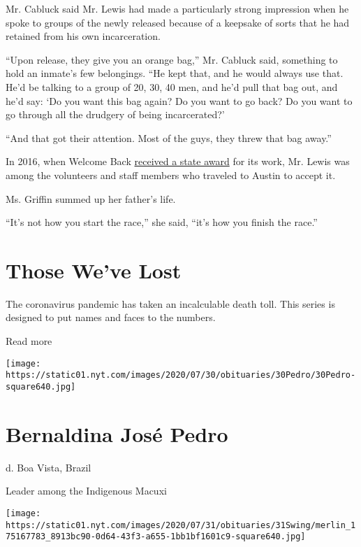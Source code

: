 Mr. Cabluck said Mr. Lewis had made a particularly strong impression
when he spoke to groups of the newly released because of a keepsake of
sorts that he had retained from his own incarceration.

``Upon release, they give you an orange bag,'' Mr. Cabluck said,
something to hold an inmate's few belongings. ``He kept that, and he
would always use that. He'd be talking to a group of 20, 30, 40 men, and
he'd pull that bag out, and he'd say: `Do you want this bag again? Do
you want to go back? Do you want to go through all the drudgery of being
incarcerated?'

``And that got their attention. Most of the guys, they threw that bag
away.''

In 2016, when Welcome Back
\href{https://www.tdcj.texas.gov/news/2016_vol_gov_awards/welcome_back_tarrant_county.html}{received
a state award} for its work, Mr. Lewis was among the volunteers and
staff members who traveled to Austin to accept it.

Ms. Griffin summed up her father's life.

``It's not how you start the race,'' she said, ``it's how you finish the
race.''

\href{https://www.nytimes.com/interactive/2020/obituaries/people-died-coronavirus-obituaries.html?action=click\&pgtype=Article\&state=default\&region=BELOW_MAIN_CONTENT\&context=covid_obits_promo}{}

\hypertarget{those-weve-lost}{%
\section{Those We've Lost}\label{those-weve-lost}}

The coronavirus pandemic has taken an incalculable death toll. This
series is designed to put names and faces to the numbers.

Read more

\texttt{[image: https://static01.nyt.com/images/2020/07/30/obituaries/30Pedro/30Pedro-square640.jpg]}

\hypertarget{bernaldina-josuxe9-pedro}{%
\section{Bernaldina José Pedro}\label{bernaldina-josuxe9-pedro}}

d. Boa Vista, Brazil

Leader among the Indigenous Macuxi

\texttt{[image: https://static01.nyt.com/images/2020/07/31/obituaries/31Swing/merlin\_175167783\_8913bc90-0d64-43f3-a655-1bb1bf1601c9-square640.jpg]}


